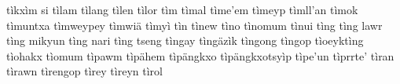tìkxìm si\hspace{2mm}
tìlam\hspace{2mm}
tìlang\hspace{2mm}
tìlen\hspace{2mm}
tìlor\hspace{2mm}
tìm\hspace{2mm}
tìmal\hspace{2mm}
tìme'em\hspace{2mm}
tìmeyp\hspace{2mm}
tìmll'an\hspace{2mm}
tìmok\hspace{2mm}
tìmuntxa\hspace{2mm}
tìmweypey\hspace{2mm}
tìmwiä\hspace{2mm}
tìmyì\hspace{2mm}
tìn\hspace{2mm}
tìnew\hspace{2mm}
tìno\hspace{2mm}
tìnomum\hspace{2mm}
tìnui\hspace{2mm}
tìng\hspace{2mm}
tìng lawr\hspace{2mm}
tìng mikyun\hspace{2mm}
tìng nari\hspace{2mm}
tìng tseng\hspace{2mm}
tìngay\hspace{2mm}
tìngäzìk\hspace{2mm}
tìngong\hspace{2mm}
tìngop\hspace{2mm}
tìoeyktìng\hspace{2mm}
tìohakx\hspace{2mm}
tìomum\hspace{2mm}
tìpawm\hspace{2mm}
tìpähem\hspace{2mm}
tìpängkxo\hspace{2mm}
tìpängkxotsyìp\hspace{2mm}
tìpe'un\hspace{2mm}
tìprrte'\hspace{2mm}
tìran\hspace{2mm}
tìrawn\hspace{2mm}
tìrengop\hspace{2mm}
tìrey\hspace{2mm}
tìreyn\hspace{2mm}
tìrol\hspace{2mm}
